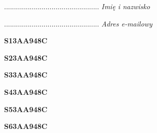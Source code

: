 \begin{turn}{90}\begin{minipage}{\linewidth} \vspace{20mm} ................................................  \textit{Imię i nazwisko}\end{minipage}\end{turn}

\begin{turn}{90}\begin{minipage}{\linewidth} \vspace{20mm} ................................................  \textit{Adres e-mailowy}\end{minipage}\end{turn}

\begin{turn}{90}\huge \begin{minipage}{\linewidth} \vspace{10mm}\textbf{S13AA948C}\end{minipage}\end{turn}

\begin{turn}{90}\huge \begin{minipage}{\linewidth} \vspace{10mm}\textbf{S23AA948C}\end{minipage}\end{turn}

\begin{turn}{90}\huge \begin{minipage}{\linewidth} \vspace{10mm}\textbf{S33AA948C}\end{minipage}\end{turn}

\begin{turn}{90}\huge \begin{minipage}{\linewidth} \vspace{10mm}\textbf{S43AA948C}\end{minipage}\end{turn}

\begin{turn}{90}\huge \begin{minipage}{\linewidth} \vspace{10mm}\textbf{S53AA948C}\end{minipage}\end{turn}

\begin{turn}{90}\huge \begin{minipage}{\linewidth} \vspace{10mm}\textbf{S63AA948C}\end{minipage}\end{turn}

